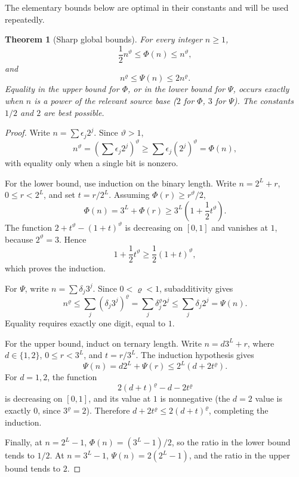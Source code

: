 \documentclass[11pt]{article}
\newtheorem{theorem}{Theorem}[section]
\theoremstyle{definition}
\begin{document}
The elementary bounds below are optimal in their constants and will be
used repeatedly.

\begin{theorem}[Sharp global bounds]\label{thm:sharp-bounds}
For every integer \(n\ge1\),
\begin{equation}\label{eq:sharp-Phi}
  \frac12 n^\vartheta\le\Phi(n)\le n^\vartheta,
\end{equation}
and
\begin{equation}\label{eq:sharp-Psi}
  n^\varrho\le\Psi(n)\le2n^\varrho.
\end{equation}
Equality in the upper bound for \(\Phi\), or in the lower bound for \(\Psi\),
occurs exactly when \(n\) is a power of the relevant source base
(\(2\) for \(\Phi\), \(3\) for \(\Psi\)).  The constants \(1/2\) and \(2\)
are best possible.
\end{theorem}

\begin{proof}
Write \(n=\sum\epsilon_j2^j\).  Since \(\vartheta>1\),
\[
 n^\vartheta
 =\left(\sum\epsilon_j2^j\right)^\vartheta
 \ge\sum\epsilon_j(2^j)^\vartheta
 =\Phi(n),
\]
with equality only when a single bit is nonzero.

For the lower bound, use induction on the binary length.  Write
\(n=2^L+r\), \(0\le r<2^L\), and set \(t=r/2^L\).  Assuming
\(\Phi(r)\ge r^\vartheta/2\),
\[
 \Phi(n)=3^L+\Phi(r)
 \ge3^L\left(1+\frac12t^\vartheta\right).
\]
The function
\(2+t^\vartheta-(1+t)^\vartheta\) is decreasing on \([0,1]\) and vanishes
at \(1\), because \(2^\vartheta=3\).  Hence
\[
 1+\frac12t^\vartheta\ge\frac12(1+t)^\vartheta,
\]
which proves the induction.

For \(\Psi\), write \(n=\sum\delta_j3^j\).  Since \(0<\varrho<1\),
subadditivity gives
\[
 n^\varrho\le\sum_j(\delta_j3^j)^\varrho
 =\sum_j\delta_j^\varrho2^j
 \le\sum_j\delta_j2^j=\Psi(n).
\]
Equality requires exactly one digit, equal to \(1\).

For the upper bound, induct on ternary length.  Write
\(n=d3^L+r\), where \(d\in\{1,2\}\), \(0\le r<3^L\), and
\(t=r/3^L\).  The induction hypothesis gives
\[
 \Psi(n)=d2^L+\Psi(r)\le2^L(d+2t^\varrho).
\]
For \(d=1,2\), the function
\[
 2(d+t)^\varrho-d-2t^\varrho
\]
is decreasing on \([0,1]\), and its value at \(1\) is nonnegative
(the \(d=2\) value is exactly \(0\), since \(3^\varrho=2\)).  Therefore
\(d+2t^\varrho\le2(d+t)^\varrho\), completing the induction.

Finally, at \(n=2^L-1\),
\(\Phi(n)=(3^L-1)/2\), so the ratio in the lower bound tends to \(1/2\).
At \(n=3^L-1\), \(\Psi(n)=2(2^L-1)\), and the ratio in the upper bound
tends to \(2\).
\end{proof}
\end{document}

